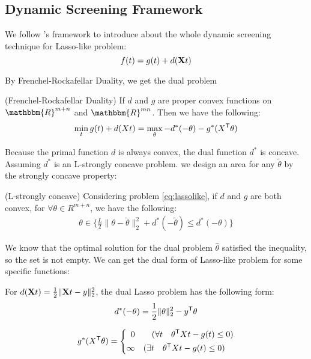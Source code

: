 \subsection{Dynamic Screening Framework}

We follow \cite{NEURIPS2021_7b5b23f4}'s framework to introduce about the whole dynamic screening technique for Lasso-like problem:
\begin{equation}
\label{eq:lassolike}
f(t) = g(t) + d(\mathbf{X} t)
\end{equation}

By Frenchel-Rockafellar Duality, we get the dual problem
\begin{thm}
 (Frenchel-Rockafellar Duality) If $d$ and $g$ are proper convex functions on $\mathbbm{R}^{m+n}$ and $\mathbbm{R}^{mn}$. Then we have the following:
 $$
\begin{aligned}
\min_t  g(t) + d(Xt) = \max_{\theta} -d^*(-\theta)-g^*(X^{\mathsf T}\theta)
\end{aligned}
$$
\end{thm}

Because the primal function $d$ is always convex, the dual function $d^*$ is concave. Assuming $d^*$ is an L-strongly concave problem. we design an area for any $\tilde{\theta}$ by the strongly concave property:

\begin{thm}\label{circle}
(L-strongly concave) Considering problem \ref{eq:lassolike}, if $d$ and $g$ are both convex, for $\forall \theta \in{R^{m+n}}$, we have the following:  
$$
\begin{aligned}
\theta \in \{\frac{L}{2}\|\theta-\tilde{\theta}\|_2^2+d^*(-\tilde{\theta}) \leq d^*(-\theta)\}
\end{aligned}
$$
\end{thm}
We know that the optimal solution for the dual problem $\hat{\theta}$ satisfied the inequality, so the set is not empty.
We can get the dual form of Lasso-like problem for some specific functions: 
\begin{lem}
For $d(\mathbf{X} t) = \frac{1}{2}\|\mathbf{X} t-y\|_2^2$, the dual Lasso problem has the following form:
$$
\begin{aligned}
d^*(-\theta) = \frac{1}{2}\|\theta\|_2^2-y^{\mathsf T}\theta
\end{aligned}
$$

$$
g^*(X^{\mathsf T}\theta) = \left\{
\begin{aligned}
0 \quad&\quad ( \forall t \quad\theta^{\mathsf T}Xt - g(t) \leq 0 )\\
\infty \quad&( \exists t \quad\theta^{\mathsf T}Xt - g(t) \leq 0 )
\end{aligned}
\right.
$$
\end{lem}





















